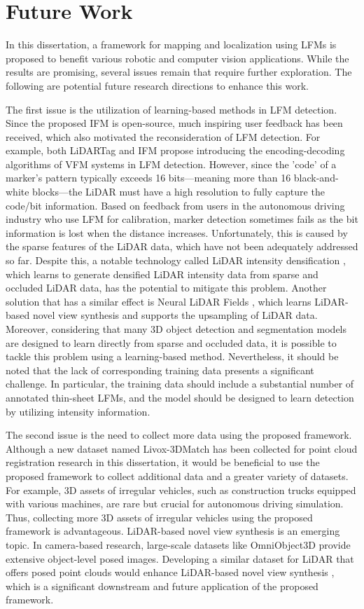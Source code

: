 \section{Future Work}
In this dissertation, a framework for mapping and localization using LFMs is proposed to benefit various robotic and computer vision applications. While the results are promising, several issues remain that require further exploration. The following are potential future research directions to enhance this work.
\par	
The first issue is the utilization of learning-based methods in LFM detection. Since the proposed IFM is open-source, much inspiring user feedback has been received, which also motivated the reconsideration of LFM detection. For example, both LiDARTag \cite{lt} and IFM \cite{iilfm} propose introducing the encoding-decoding algorithms of VFM systems in LFM detection. However, since the 'code' of a marker's pattern typically exceeds 16 bits—meaning more than 16 black-and-white blocks—the LiDAR must have a high resolution to fully capture the code/bit information. Based on feedback from users in the autonomous driving industry who use LFM for calibration, marker detection sometimes fails as the bit information is lost when the distance increases. Unfortunately, this is caused by the sparse features of the LiDAR data, which have not been adequately addressed so far. Despite this, a notable technology called LiDAR intensity densification \cite{dense}, which learns to generate densified LiDAR intensity data from sparse and occluded LiDAR data, has the potential to mitigate this problem.
Another solution that has a similar effect is Neural LiDAR Fields \cite{lidarnerf}, which learns LiDAR-based novel view synthesis and supports the upsampling of LiDAR data. Moreover, considering that many 3D object detection and segmentation models are designed to learn directly from sparse and occluded data, it is possible to tackle this problem using a learning-based method. Nevertheless, it should be noted that the lack of corresponding training data presents a significant challenge. In particular, the training data should include a substantial number of annotated thin-sheet LFMs, and the model should be designed to learn detection by utilizing intensity information.
\par
The second issue is the need to collect more data using the proposed framework. Although a new dataset named Livox-3DMatch has been collected for point cloud registration research in this dissertation, it would be beneficial to use the proposed framework to collect additional data and a greater variety of datasets. For example, 3D assets of irregular vehicles, such as construction trucks equipped with various machines, are rare but crucial for autonomous driving simulation. Thus, collecting more 3D assets of irregular vehicles using the proposed framework is advantageous. LiDAR-based novel view synthesis is an emerging topic. In camera-based research, large-scale datasets like OmniObject3D \cite{omni} provide extensive object-level posed images. Developing a similar dataset for LiDAR that offers posed point clouds would enhance LiDAR-based novel view synthesis \cite{lidarnerf,lidarnerf2}, which is a significant downstream and future application of the proposed framework.
